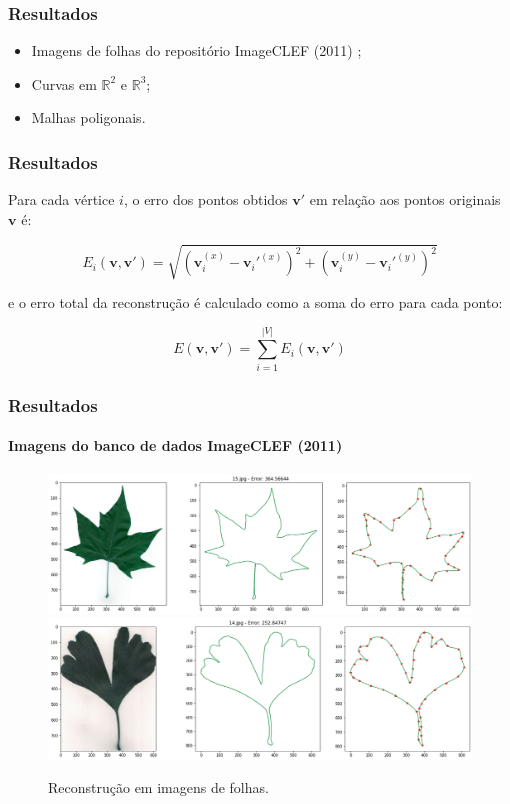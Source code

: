 \begin{frame}
\frametitle{Resultados}

\begin{itemize}
\item Imagens de folhas do repositório ImageCLEF (2011) \cite{imageclef2011};
\item Curvas em $\mathbb{R}^2$ e $\mathbb{R}^3$;
\item Malhas poligonais.
\end{itemize}
	
\end{frame}


\begin{frame}
\frametitle{Resultados}


\bigskip
Para cada vértice $i$, o erro dos pontos obtidos $\mathbf{v'}$ em relação aos pontos originais $\mathbf{v}$ é:

$$E_i(\mathbf{v, v'}) = \sqrt{(\mathbf v_i^{(x)} - \mathbf v_i'^{(x)})^2 + (\mathbf v_i^{(y)} - \mathbf v_i'^{(y)})^2}$$

\medskip

\noindent e o erro total da reconstrução é calculado como a soma do erro para cada ponto:

$$E(\mathbf{v, v'}) = \sum_{i = 1}^{|V|}E_i(\mathbf{v, v'})$$

\end{frame}


\begin{frame}
\frametitle{Resultados}
\framesubtitle{Imagens do banco de dados ImageCLEF (2011) \cite{imageclef2011}}
\begin{figure}[ht!]
	\centering
	\caption{Reconstrução em imagens de folhas.}
	\includegraphics[width=0.9\linewidth]{img/leaf_1.png}
	\includegraphics[width=0.9\linewidth]{img/leaf_2.png}
	\label{fig:leafs}
\end{figure}

\end{frame}


